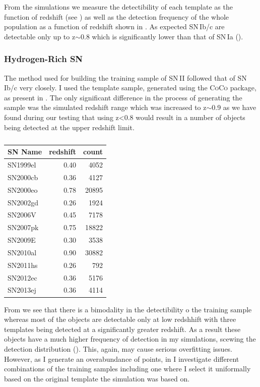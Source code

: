 From the simulations we measure the detectibility of each template as the function of redshift (see ) as well as the detection frequency of the whole population as a function of redshift shown in . As expected SN\,Ib/c are detectable only up to z$\sim$0.8 which is significantly lower than that of SN\,Ia ().

\begin{figure}
  \caption{}
  \label{fig:IbcDist}
\end{figure}

\subsubsection{Hydrogen-Rich SN}
The method used for building the training sample of SN\,II followed that of SN\,Ib/c very closely. I used the template sample, generated using the \textsc{CoCo} package, as present in . The only significant difference in the process of generating the sample was the simulated redshift range which was increased to z$\sim$0.9 as we have found during our testing that using z<0.8 would result in a number of objects being detected at the upper redshift limit.

\begin{table}
  \caption{}
  \label{tab:SNIITemplates}
  \centering
  \begin{tabular}{l|r|r}
    SN Name  & redshift & count \\
    \hline
    SN1999el & 0.40 &  4052 \\
    SN2000cb & 0.36 &  4127 \\
    SN2000eo & 0.78 & 20895 \\
    SN2002gd & 0.26 &  1924 \\
    SN2006V  & 0.45 &  7178 \\
    SN2007pk & 0.75 & 18822 \\
    SN2009E  & 0.30 &  3538 \\
    SN2010al & 0.90 & 30882 \\
    SN2011hs & 0.26 &   792 \\
    SN2012ec & 0.36 &  5176 \\
    SN2013ej & 0.36 &  4114 \\
    \hline
  \end{tabular}
\end{table}

From  we see that there is a bimodality in the detectibility o the training sample whereas most of the objects are detectable only at low redshhift with three templates being detected at a significantly greater redshift. As a result these objects have a much higher frequency of detection in my simulations, scewing the detection distribution (). This, again, may cause serious overfitting issues. However, as I generate an overabundance of points, in  I investigate different combinations of the training samples including one where I select it uniformally based on the original template the simulation was based on.

